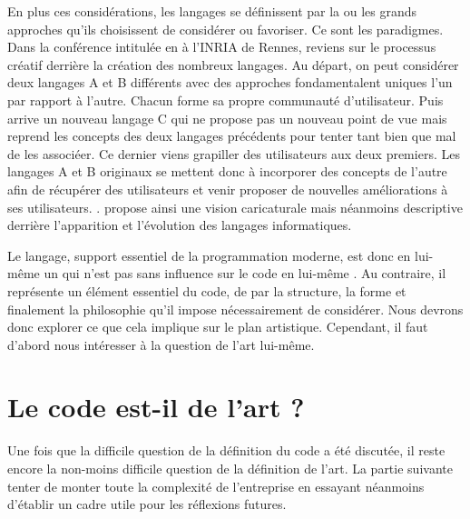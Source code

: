 \documentclass[12pt]{article} %
\begin{document}
En plus ces considérations, les langages se définissent par la ou les grands approches qu'ils choisissent de considérer ou favoriser. Ce sont les paradigmes. Dans la conférence intitulée  en  à l'INRIA de Rennes, \citeauthor{GerardBerry2015} reviens sur le processus créatif derrière la création des nombreux langages. Au départ, on peut considérer deux langages A et B différents avec des approches fondamentalent uniques l'un par rapport à l'autre. Chacun forme sa propre communauté d'utilisateur. Puis arrive un nouveau langage C qui ne propose pas un nouveau point de vue mais reprend les concepts des deux langages précédents pour tenter tant bien que mal de les associéer. Ce dernier viens grapiller des utilisateurs aux deux premiers. Les langages A et B originaux se mettent donc à incorporer des concepts de l'autre afin de récupérer des utilisateurs et venir proposer de nouvelles améliorations à ses utilisateurs. \cite{GerardBerry2015}. \citeauthor{GerardBerry2015} propose ainsi une vision caricaturale mais néanmoins descriptive derrière l'apparition et l'évolution des langages informatiques.

Le langage, support essentiel de la programmation moderne, est donc en lui-même un  \cite{GerardBerry2015} qui n'est pas sans influence sur le code en lui-même \cite{Dijkstra1976}. Au contraire, il représente un élément essentiel du code, de par la structure, la forme et finalement la philosophie qu'il impose nécessairement de considérer. Nous devrons donc explorer ce que cela implique sur le plan artistique. Cependant, il faut d'abord nous intéresser à la question de l'art lui-même.

\section{Le code est-il de l'art ?}
Une fois que la difficile question de la définition du code a été discutée, il reste encore la non-moins difficile question de la définition de l'art. La partie suivante tenter de monter toute la complexité de l'entreprise en essayant néanmoins d'établir un cadre utile pour les réflexions futures.
\end{document}
